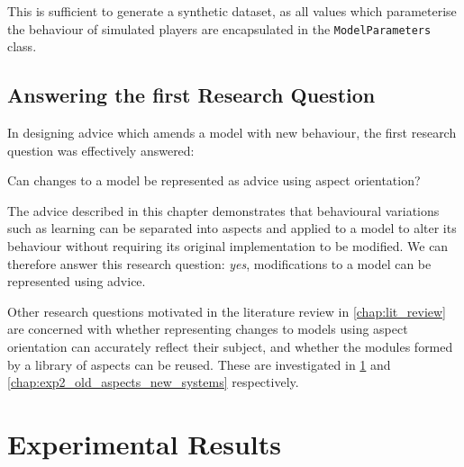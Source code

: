 This is sufficient to generate a synthetic dataset, as all values which
parameterise the behaviour of simulated players are encapsulated in the
\lstinline{ModelParameters} class. 





\subsection{Answering the first Research Question}
In designing advice which amends a model with new behaviour, the first research
question was effectively answered:

\begin{researchquestion}
  Can changes to a model be represented as advice using aspect orientation?
\end{researchquestion}

The advice described in this chapter demonstrates that behavioural variations
such as learning can be separated into aspects and applied to a model to alter
its behaviour without requiring its original implementation to be modified. We
can therefore answer this research question: \emph{yes}, modifications to a
model can be represented using advice.


Other research questions motivated in the literature review in
\cref{chap:lit_review} are concerned with whether representing changes to models
using aspect orientation can accurately reflect their subject, and whether the
modules formed by a library of aspects can be reused. These are investigated in
\cref{sec:optimisation_with_aspects_experimental_results} and
\cref{chap:exp2_old_aspects_new_systems} respectively.

\section{Experimental Results}
\label{sec:optimisation_with_aspects_experimental_results}



